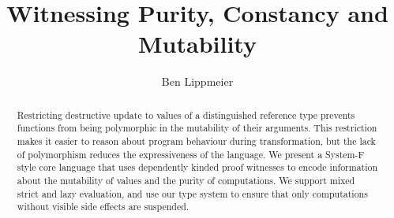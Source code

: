 \documentclass{llncs}
\begin{document}
\title		{Witnessing Purity, Constancy and Mutability}
\author		{Ben Lippmeier}
\maketitle


\begin{abstract}
Restricting destructive update to values of a distinguished reference type prevents functions from being polymorphic in the mutability of their arguments. This restriction makes it easier to reason about program behaviour during transformation, but the lack of polymorphism reduces the expressiveness of the language. We present a System-F style core language that uses dependently kinded proof witnesses to encode information about the mutability of values and the purity of computations. We support mixed strict and lazy evaluation, and use our type system to ensure that only computations without visible side effects are suspended.

\end{abstract}







\clearpage{}


\end{document}
